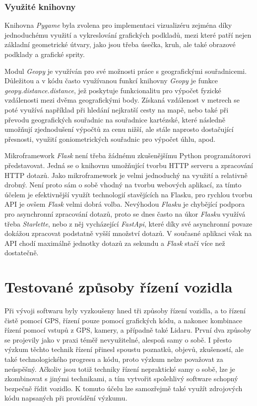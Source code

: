\documentclass[czech, bachelor]{diploma}
\begin{document}
\subsection{Využité knihovny}

Knihovna \emph{Pygame} byla zvolena pro implementaci vizualizéru zejména díky jednoduchému využití a vykreslování grafických
podkladů, mezi které patří nejen základní geometrické útvary, jako jsou třeba úsečka, kruh, ale také obrazové podklady a grafické
sprity.

Modul \emph{Geopy} je využíván pro své možnosti práce s geografickými souřadnicemi. Důležitou a v kódu často využívanou funkcí
knihovny \emph{Geopy} je funkce \emph{geopy.distance.distance}, jež poskytuje funkcionalitu pro výpočet fyzické vzdálenosti mezi
dvěma geografickými body. Získaná vzdálenost v metrech se poté využívá například při hledání nejkratší cesty na mapě, nebo také
při převodu geografických souřadnic na souřadnice kartézské, které následně umožňují zjednodušení výpočtů za cenu nižší, ale stále
naprosto dostačující přesnosti, využití goniometrických souřadnic pro výpočet úhlu, apod.

Mikroframework \emph{Flask} není třeba žádnému zkušenějšímu Python programátorovi představovat. Jedná se o knihovnu umožňující
tvorbu HTTP serveru a zpracování HTTP dotazů. Jako mikroframework je velmi jednoduchý na využití a relativně drobný. Není proto
sám o sobě vhodný na tvorbu webových aplikací, za tímto účelem je efektivnější využít technologií stavějících na Flasku, pro
rychlou tvorbu API je ovšem \emph{Flask} velmi dobrá volba. Nevýhodou \emph{Flasku} je chybějící podpora pro asynchronní
zpracování dotazů, proto se dnes často na úkor \emph{Flasku} využívá třeba \emph{Starlette}, nebo z něj vycházející
\emph{FastApi}, které díky své asynchronní povaze dokážou zpracovat podstatně vyšší množství dotazů. V současné aplikaci však
na API chodí maximálně jednotky dotazů za sekundu a \emph{Flask} stačí více než dostatečně.

\chapter{Testované způsoby řízení vozidla} \label{driving-methods}

Při vývoji softwaru byly vyzkoušeny hned tři způsoby řízení vozidla, a to řízení čistě pomocí GPS, řízení pouze pomocí grafických
kódu, a nakonec kombinace řízení pomocí vstupů z GPS, kamery, a případně také Lidaru. První dva způsoby se projevily jako v praxi
téměř nevyužitelné, alespoň samy o sobě. I přesto výzkum těchto technik řízení přinesl spoustu poznatků, objevů, zkušeností, ale
také technologického progresu a kódu, proto výzkum nelze považovat za neúspěšný. Ačkoliv jsou totiž techniky řízení nepraktické
samy o sobě, lze je zkombinovat s jinými technikami, a tím vytvořit spolehlivý software schopný bezpečně řídit vozidlo. K tomuto
účelu lze samozřejmě také využít zdrojových kódu napsaných při provádění výzkumu.
\end{document}
